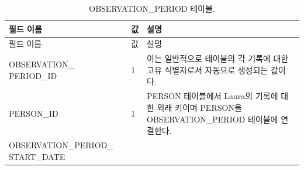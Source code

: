 \documentclass[10.5pt]{book}
\theoremstyle{definition}
\theoremstyle{definition}
\theoremstyle{definition}
\theoremstyle{remark}
\begin{document}
\begin{longtable}[]{@{}lll@{}}
\caption{\label{tab:observationPeriod} OBSERVATION\_PERIOD
테이블.}\tabularnewline
\toprule
\begin{minipage}[b]{0.29\columnwidth}\raggedright\strut
필드 이름\strut
\end{minipage} & \begin{minipage}[b]{0.14\columnwidth}\raggedright\strut
값\strut
\end{minipage} & \begin{minipage}[b]{0.48\columnwidth}\raggedright\strut
설명\strut
\end{minipage}\tabularnewline
\midrule
\endfirsthead
\toprule
\begin{minipage}[b]{0.29\columnwidth}\raggedright\strut
필드 이름\strut
\end{minipage} & \begin{minipage}[b]{0.14\columnwidth}\raggedright\strut
값\strut
\end{minipage} & \begin{minipage}[b]{0.48\columnwidth}\raggedright\strut
설명\strut
\end{minipage}\tabularnewline
\midrule
\endhead
\begin{minipage}[t]{0.29\columnwidth}\raggedright\strut
OBSERVATION\_ PERIOD\_ID\strut
\end{minipage} & \begin{minipage}[t]{0.14\columnwidth}\raggedright\strut
1\strut
\end{minipage} & \begin{minipage}[t]{0.48\columnwidth}\raggedright\strut
이는 일반적으로 테이블의 각 기록에 대한 고유 식별자로서 자동으로
생성되는 값이다.\strut
\end{minipage}\tabularnewline
\begin{minipage}[t]{0.29\columnwidth}\raggedright\strut
PERSON\_ID\strut
\end{minipage} & \begin{minipage}[t]{0.14\columnwidth}\raggedright\strut
1\strut
\end{minipage} & \begin{minipage}[t]{0.48\columnwidth}\raggedright\strut
PERSON 테이블에서 Laura의 기록에 대한 외래 키이며 PERSON을
OBSERVATION\_PERIOD 테이블에 연결한다.\strut
\end{minipage}\tabularnewline
\begin{minipage}[t]{0.29\columnwidth}\raggedright\strut
OBSERVATION\_PERIOD\_ START\_DATE\strut
\end{minipage} & \begin{minipage}[t]{0.14\columnwidth}\raggedright\strut

\end{minipage}
\end{longtable}
\end{document}
